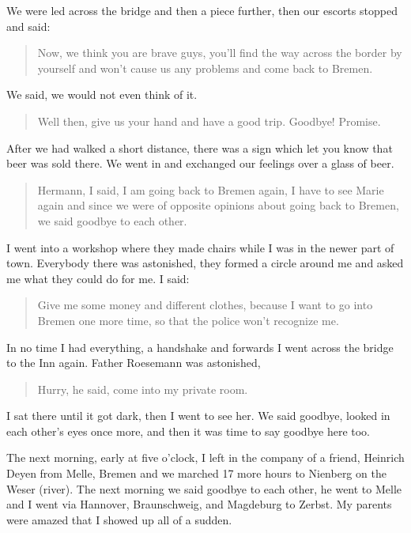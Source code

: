 We were led across the bridge and then a piece further, then our escorts stopped and said:

\begin{quote}
Now, we think you are brave guys, you'll find the way across the border by yourself and won't cause us any problems and come back to Bremen.
\end{quote}

We said, we would not even think of it.

\begin{quote}
Well then, give us your hand and have a good trip. Goodbye! Promise.
\end{quote}

After we had walked a short distance, there was a sign which let you know that beer was sold there. We went in and exchanged our feelings over a glass of beer.

\begin{quote}
Hermann, I said, I am going back to Bremen again, I have to see Marie again and since we were of opposite opinions about going back to Bremen, we said goodbye to each other.
\end{quote}

I went into a workshop where they made chairs while I was in the newer part of town. Everybody there was astonished, they formed a circle around me and asked me what they could do for me. I said:

\begin{quote}
Give me some money and different clothes, because I want to go into Bremen one more time, so that the police won't recognize me.
\end{quote}

In no time I had everything, a handshake and forwards I went across the bridge to the Inn again. Father Roesemann was astonished,

\begin{quote}
Hurry, he said, come into my private room.
\end{quote}

I sat there until it got dark, then I went to see her. We said goodbye, looked in each other's eyes once more, and then it was time to say goodbye here too.

The next morning, early at five o'clock, I left in the company of a friend, Heinrich Deyen from Melle, Bremen and we marched 17 more hours to Nienberg on the Weser (river). The next morning we said goodbye to each other, he went to Melle and I went via Hannover, Braunschweig, and Magdeburg to Zerbst. My parents were amazed that I showed up all of a sudden.

